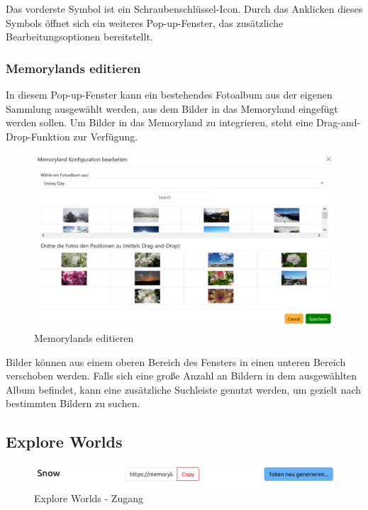 Das vorderste Symbol ist ein Schraubenschlüssel-Icon. Durch das Anklicken dieses Symbols öffnet sich ein weiteres Pop-up-Fenster, das zusätzliche Bearbeitungsoptionen bereitstellt. 

\subsubsection{Memorylands editieren}

In diesem Pop-up-Fenster kann ein bestehendes Fotoalbum aus der eigenen Sammlung ausgewählt werden, aus dem Bilder in das Memoryland eingefügt werden sollen. Um Bilder in das Memoryland zu integrieren, steht eine Drag-and-Drop-Funktion zur Verfügung. 

\begin{figure} [h t]
    \centering
    \includegraphics[scale=0.6]{pics/all_worlds_teil2_button.PNG}
    \caption{Memorylands editieren}
    \label{fig:all-worlds-memorylands-editieren}
\end{figure}

Bilder können aus einem oberen Bereich des Fensters in einen unteren Bereich verschoben werden. Falls sich eine gro\ss{}e Anzahl an Bildern in dem ausgewählten Album befindet, kann eine zusätzliche Suchleiste genutzt werden, um gezielt nach bestimmten Bildern zu suchen.

\clearpage

\subsection{Explore Worlds}
\label{subsec:frontend-explore-worlds}

\begin{figure} [h t]
    \centering
    \includegraphics[scale=0.2]{pics/explore_worlds_header.png}
    \caption{Explore Worlds - Zugang}
    \label{fig:explore-worlds-overview}
\end{figure}

